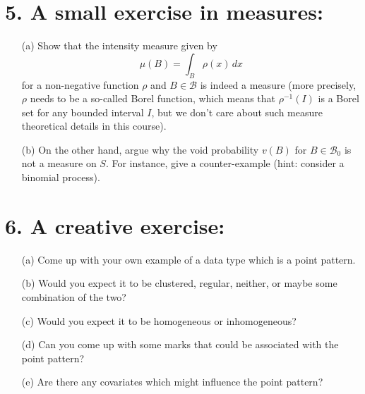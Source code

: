 \documentclass{article}
\begin{document}
\section*{5. A small exercise in measures:}
\begin{enumerate}
    \item[(a)] Show that the intensity measure given by
    \[
    \mu(B) = \int_B \rho(x) \, dx
    \]
    for a non-negative function $\rho$ and $B \in \mathcal{B}$ is indeed a measure (more precisely, $\rho$ needs to be a so-called Borel function, which means that $\rho^{-1}(I)$ is a Borel set for any bounded interval $I$, but we don’t care about such measure theoretical details in this course).
    
    \item[(b)] On the other hand, argue why the void probability $v(B)$ for $B \in \mathcal{B}_0$ is not a measure on $S$. For instance, give a counter-example (hint: consider a binomial process).
\end{enumerate}

\section*{6. A creative exercise:}
\begin{enumerate}
    \item[(a)] Come up with your own example of a data type which is a point pattern.
    
    \item[(b)] Would you expect it to be clustered, regular, neither, or maybe some combination of the two?
    
    \item[(c)] Would you expect it to be homogeneous or inhomogeneous?
    \item[] 
    \item[(d)] Can you come up with some marks that could be associated with the point pattern?
    
    \item[(e)] Are there any covariates which might influence the point pattern?
\end{enumerate}
\end{document}
